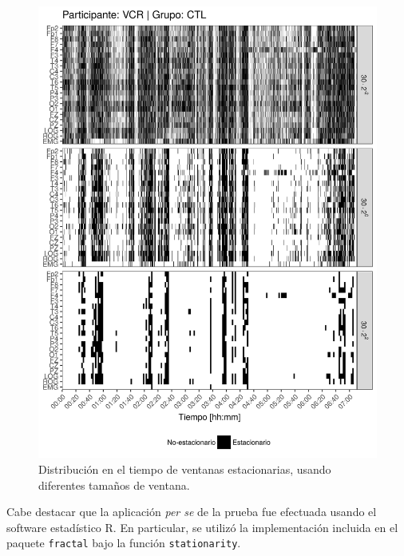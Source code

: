 \begin{figure}
\centering
\includegraphics[width=\linewidth]
{./img_art_dfa/VCNNS1_comp_est_.png}
\caption{Distribución en el tiempo de ventanas estacionarias, usando diferentes tamaños
de ventana.}
\label{comp_VCR}
\end{figure}

Cabe destacar que la aplicación \textit{per se} de la prueba fue efectuada usando el software 
estadístico R. En particular, se utilizó la implementación 
incluida en el paquete \texttt{fractal} \cite{R_fractal} bajo la función \texttt{stationarity}.


